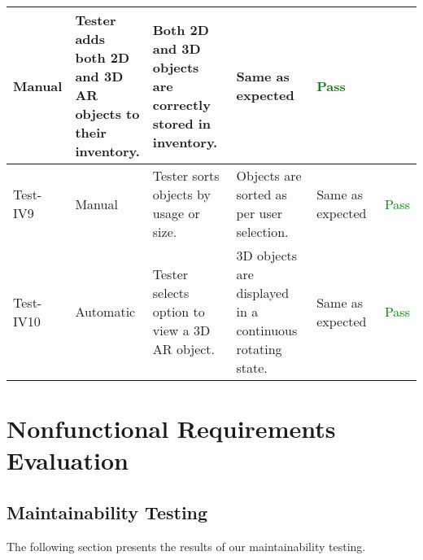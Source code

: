 \documentclass[12pt, titlepage]{article}
\begin{document}
\begin{table}[H]
{\begin{tabular}{|l|p{0.15\linewidth}|p{0.3\linewidth}|p{0.3\linewidth}|p{0.3\linewidth}|p{0.1\linewidth}|}
      Manual & 
      Tester adds both 2D and 3D AR objects to their inventory. &
      Both 2D and 3D objects are correctly stored in inventory. & 
      Same as expected & 
      \textcolor{Green}{Pass} \\
      \hline
      Test-IV9 & 
      Manual & 
      Tester sorts objects by usage or size. &
      Objects are sorted as per user selection. & 
      Same as expected & 
      \textcolor{Green}{Pass} \\
      \hline
      Test-IV10 & 
      Automatic & 
      Tester selects option to view a 3D AR object. &
      3D objects are displayed in a continuous rotating state. & 
      Same as expected & 
      \textcolor{Green}{Pass} \\
      \hline
    \end{tabular}}
  \label{table:Inventory_Tests}
\end{table}

\section{Nonfunctional Requirements Evaluation}

\subsection{Maintainability Testing}
The following section presents the results of our maintainability testing.

\begin{table}[H]
  \caption{\bf Maintainability Testing Evaluation Results}
  \label{table:Maintainability_Tests}
\end{table}
\end{document}
